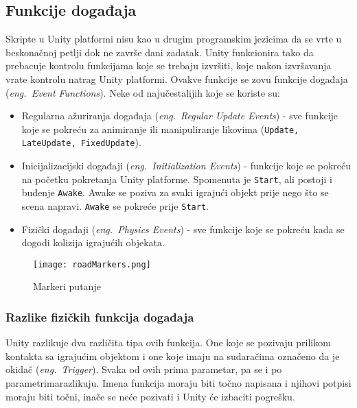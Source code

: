 \subsection{Funkcije događaja}
Skripte u Unity platformi nisu kao u drugim programskim jezicima da se vrte u beskonačnoj petlji dok ne završe dani zadatak. Unity funkcionira tako da prebacuje kontrolu funkcijama koje se trebaju izvršiti, koje nakon izvršavanja vrate kontrolu natrag Unity platformi. Ovakve funkcije se zovu funkcije događaja (\emph{eng.~Event Functions}). Neke od najučestalijih koje se koriste su:
\begin{itemize} 
	\item Regularna ažuriranja događaja (\emph{eng.~Regular Update Events}) - sve funkcije koje se pokreću za animiranje ili manipuliranje likovima (\texttt{Update, LateUpdate, FixedUpdate}).
	\item Inicijalizacijski događaji (\emph{eng.~Initialization Events}) - funkcije koje se pokreću na početku pokretanja Unity platforme. Spomenuta je \texttt{Start}, ali postoji i buđenje \texttt{Awake}. Awake se poziva za svaki igrajući objekt prije nego što se scena napravi. \texttt{Awake} se pokreće prije \texttt{Start}.
	\item Fizički događaji (\emph{eng.~Physics Events}) - sve funkcije koje se pokreću kada se dogodi kolizija igrajućih objekata.
\end{itemize}
\begin{figure}[h]
	\texttt{[image: roadMarkers.png]}
	\centering
	\caption{Markeri putanje}
	\label{fig:markeriPutanje}
\end{figure}
\subsubsection{Razlike fizičkih funkcija događaja}
Unity razlikuje dva različita tipa ovih funkcija. One koje se pozivaju prilikom kontakta sa igrajućim objektom i one koje imaju na sudaračima označeno da je okidač (\emph{eng.~Trigger}). Svaka od ovih prima parametar, pa se i po parametrimarazlikuju. Imena funkcija moraju biti točno napisana i njihovi potpisi moraju biti točni, inače se neće pozivati i Unity će izbaciti pogrešku.

